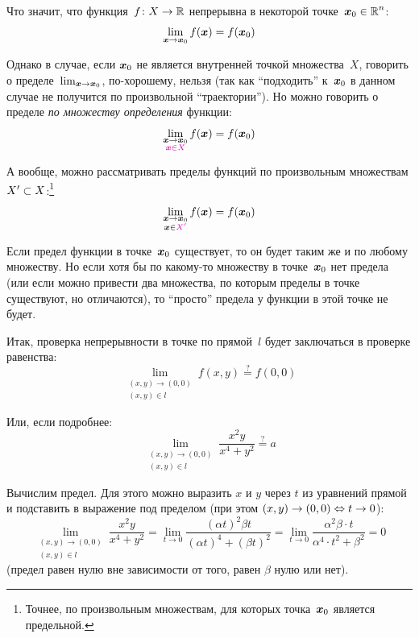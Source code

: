\documentclass[a4paper,12pt]{article}
\begin{document}
  \begin{solution}
    Что значит, что функция~$f\colon X \to \operatorname{\mathbb R}$ непрерывна в некоторой точке~$\bds x_0 \hm\in \RR^n$:
    \[
      \lim_{\boldsymbol x \to \boldsymbol x_0} f(\boldsymbol x) = f(\boldsymbol x_0)
    \]

    Однако в случае, если $\boldsymbol x_0$ не является внутренней точкой множества~$X$, говорить о пределе~$\lim_{\boldsymbol x \to \boldsymbol x_0}$, по-хорошему, нельзя (так как ``подходить'' к~$\boldsymbol x_0$ в данном случае не получится по произвольной ``траектории'').
    Но можно говорить о пределе \emph{по множеству определения} функции:
    \[
      \lim_{\substack{\bds x \to \bds x_0 \\ \textcolor{pink}{\bds x \in X}}} f(\bds x) = f(\bds x_0)
    \]

    А вообще, можно рассматривать пределы функций по произвольным множествам $X' \hm\subset X$:\footnote{
      Точнее, по произвольным множествам, для которых точка~$\boldsymbol x_0$ является предельной.
    }
    \[
      \lim_{\substack{\bds x \to \bds x_0 \\ \bds x \in \textcolor{pink}{X'}}} f(\bds x) = f(\bds x_0)
    \]

    Если предел функции в точке~$\boldsymbol x_0$ существует, то он будет таким же и по любому множеству.
    Но если хотя бы по какому-то множеству в точке~$\boldsymbol x_0$ нет предела (или если можно привести два множества, по которым пределы в точке существуют, но отличаются), то ``просто'' предела у функции в этой точке не будет.

    \medskip

    Итак, проверка непрерывности в точке по прямой~$l$ будет заключаться в проверке равенства:
    \[
      \lim_{\substack{(x, y) \to (0, 0) \\ (x, y) \in l}} f(x, y) \overset{?}{=} f(0, 0)
    \]

    Или, если подробнее:
    \[
      \lim_{\substack{(x, y) \to (0, 0) \\ (x, y) \in l}} \frac{x^2 y}{x^4 + y^2} \overset{?}{=} a
    \]

    Вычислим предел.
    Для этого можно выразить $x$ и $y$ через $t$ из уравнений прямой и подставить в выражение под пределом (при этом $(x, y) \hm\to (0, 0) \hm\Leftrightarrow t \hm\to 0$):
    \begin{equation*}
      \lim_{\substack{(x, y) \to (0, 0) \\ (x, y) \in l}} \frac{x^2 y}{x^4 + y^2}
        = \lim_{t \to 0} \frac{(\alpha t)^2 \beta t}{(\alpha t)^4 + (\beta t)^2}
        = \lim_{t \to 0} \frac{\alpha^2 \beta \cdot t}{\alpha^4 \cdot t^2 + \beta^2}
        = 0
    \end{equation*}
    (предел равен нулю вне зависимости от того, равен $\beta$ нулю или нет).


\end{solution}
\end{document}
